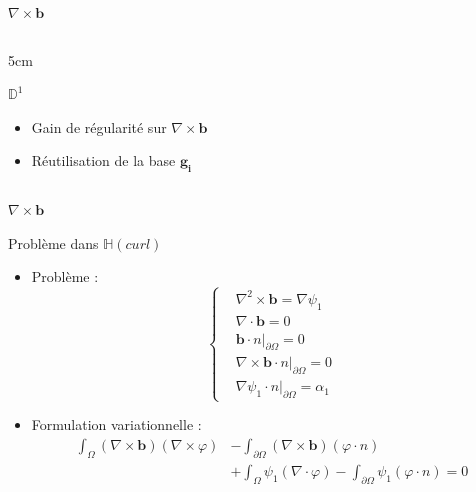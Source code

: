 \documentclass{beamer}
\newcommand{\HH}{{\mathbb{H}}}
\newcommand{\DD}{{\mathbb{D}}}
\newcommand{\grad}{{\nabla}}
\newcommand{\laplace}{{\Delta}}
\newcommand{\rot}{{\nabla\times}}
\newcommand{\rott}{{\nabla^2\times}}
\newcommand{\diverg}{{\nabla\cdot}}
\newcommand{\restr}{{\big\rvert_{\partial\Omega}}}
\begin{document}
\begin{frame}{$\rot \mathbf{b}$}
\begin{columns}[t]
\begin{column}{5cm}
\begin{block}{$\DD^1$}
\begin{itemize}
\begin{eqnarray*}
\begin{aligned}
\end{aligned}
\right.\\
\left\{
\begin{aligned}
&-\laplace\psi_1 = 0\\
&\grad\psi_1\cdot n\restr=\alpha_1
\end{aligned}
\right.
\end{eqnarray*}
\item[+] Gain de régularité sur $\rot \mathbf{b}$
\item[+] Réutilisation de la base $\mathbf{g_i}$ 
\end{itemize}
\end{block}
\end{column}
\end{columns}
\end{frame}

\begin{frame}{$\rot \mathbf{b}$}
\begin{block}{Problème dans $\HH(curl)$}
\begin{itemize}
\item Problème :
\[\left\{
\begin{aligned}
&\rott \mathbf{b} = \grad\psi_1\\
&\diverg \mathbf{b} = 0\\
&\mathbf{b}\cdot n\restr = 0\\
&\rot \mathbf{b}\cdot n\restr = 0\\
&\grad\psi_1\cdot n\restr = \alpha_1
\end{aligned}
\right.\]
\item Formulation variationnelle :
\begin{align*}
\int_\Omega (\rot \mathbf{b})(\rot\varphi) &- \int_{\partial\Omega} (\rot \mathbf{b})(\varphi\cdot n) \\
&+\int_\Omega \psi_1(\diverg\varphi) - \int_{\partial\Omega} \psi_1(\varphi\cdot n) = 0
\end{align*}
\end{itemize}
\end{block}
\end{frame}
\end{document}
